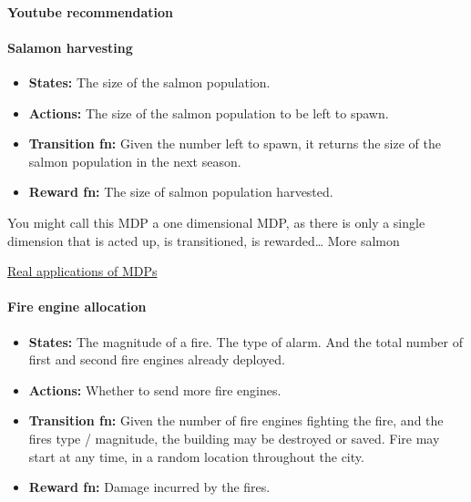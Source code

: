 \hypertarget{youtube-recommendation}{%
\paragraph{Youtube recommendation}\label{youtube-recommendation}}

\hypertarget{salamon-harvesting}{%
\paragraph{Salamon harvesting}\label{salamon-harvesting}}

\begin{itemize}
\tightlist
\item
  \textbf{States:} The size of the salmon population.
\item
  \textbf{Actions:} The size of the salmon population to be left to
  spawn.
\item
  \textbf{Transition fn:} Given the number left to spawn, it returns the
  size of the salmon population in the next season.
\item
  \textbf{Reward fn:} The size of salmon population harvested.
\end{itemize}

You might call this MDP a one dimensional MDP, as there is only a single
dimension that is acted up, is transitioned, is rewarded\ldots{} More
salmon

\href{http://www.it.uu.se/edu/course/homepage/aism/st11/MDPApplications1.pdf}{Real
applications of MDPs}

\hypertarget{fire-engine-allocation}{%
\paragraph{Fire engine allocation}\label{fire-engine-allocation}}

\begin{itemize}
\tightlist
\item
  \textbf{States:} The magnitude of a fire. The type of alarm. And the
  total number of first and second fire engines already deployed.
\item
  \textbf{Actions:} Whether to send more fire engines.
\item
  \textbf{Transition fn:} Given the number of fire engines fighting the
  fire, and the fires type / magnitude, the building may be destroyed or
  saved. Fire may start at any time, in a random location throughout the
  city.
\item
  \textbf{Reward fn:} Damage incurred by the fires.
\end{itemize}

